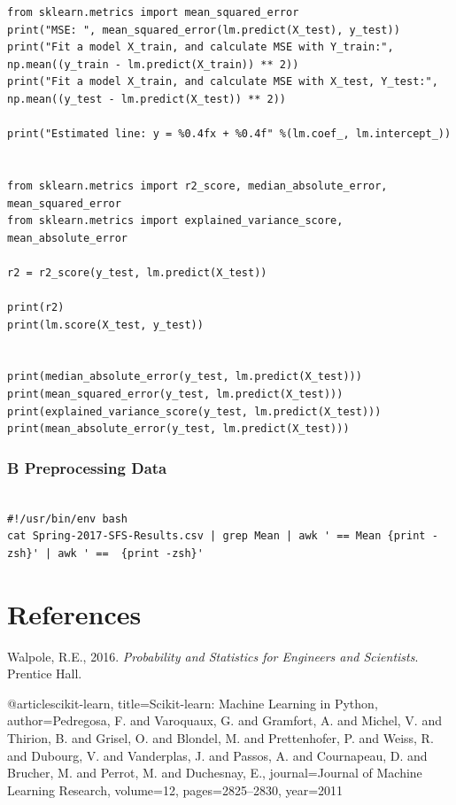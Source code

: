 \documentclass[10pt]{report}
\begin{document}
\begin{lstlisting}
from sklearn.metrics import mean_squared_error
print("MSE: ", mean_squared_error(lm.predict(X_test), y_test))
print("Fit a model X_train, and calculate MSE with Y_train:", np.mean((y_train - lm.predict(X_train)) ** 2))
print("Fit a model X_train, and calculate MSE with X_test, Y_test:", np.mean((y_test - lm.predict(X_test)) ** 2))

print("Estimated line: y = %0.4fx + %0.4f" %(lm.coef_, lm.intercept_))


from sklearn.metrics import r2_score, median_absolute_error, mean_squared_error
from sklearn.metrics import explained_variance_score, mean_absolute_error

r2 = r2_score(y_test, lm.predict(X_test))

print(r2)
print(lm.score(X_test, y_test))


print(median_absolute_error(y_test, lm.predict(X_test)))
print(mean_squared_error(y_test, lm.predict(X_test)))
print(explained_variance_score(y_test, lm.predict(X_test)))
print(mean_absolute_error(y_test, lm.predict(X_test)))

\end{lstlisting}

\subsubsection*{B Preprocessing Data}

\lstset{language=Bash}
\begin{lstlisting}

#!/usr/bin/env bash
cat Spring-2017-SFS-Results.csv | grep Mean | awk ' == Mean {print -zsh}' | awk ' ==  {print -zsh}'

\end{lstlisting}


\newpage
\section*{References}

Walpole, R.E., 2016. \textit{Probability and Statistics for Engineers and Scientists}. Prentice Hall.
\newline
\newline

@article{scikit-learn,
 title={Scikit-learn: Machine Learning in {P}ython},
 author={Pedregosa, F. and Varoquaux, G. and Gramfort, A. and Michel, V.
         and Thirion, B. and Grisel, O. and Blondel, M. and Prettenhofer, P.
         and Weiss, R. and Dubourg, V. and Vanderplas, J. and Passos, A. and
         Cournapeau, D. and Brucher, M. and Perrot, M. and Duchesnay, E.},
 journal={Journal of Machine Learning Research},
 volume={12},
 pages={2825--2830},
 year={2011}
}
\end{document}
